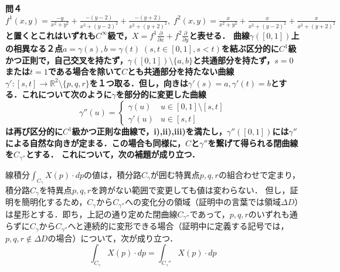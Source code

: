 \documentclass[dvipdfmx,a4paper,uplatex]{jsarticle}
\begin{document}
\bf{問４} $f^1(x,y)=\frac{-y}{x^2+y^2}+\frac{-(y-2)}{x^2+(y-2)^2}+\frac{-(y+2)}{x^2+(y+2)^2},\; f^2(x,y)=\frac{x}{x^2+y^2}+\frac{x}{x^2+(y-2)^2}+\frac{x}{x^2+(y+2)^2}$と置くとこれはいずれも$C^\infty$級で，$X=f^1\frac{\partial}{\partial x}+f^2\frac{\partial}{\partial y}$と表せる．
曲線$\gamma([0,1])$上の相異なる２点$a=\gamma(s),b=\gamma(t)\;(s,t\in[0,1],s<t)$を結ぶ区分的に$C^1$級かつ正則で，自己交叉を持たず，$\gamma([0,1])\setminus \{a,b\}$と共通部分を持たず，$s=0$または$t=1$である場合を除いて$C$とも共通部分を持たない曲線$\gamma':[s,t]\to\mathbb{R}^2\setminus\{p,q,r\}$を１つ取る．但し，向きは$\gamma'(s)=a,\gamma'(t)=b$とする．これについて次のように$\gamma$を部分的に変更した曲線
\[\gamma''(u)=\begin{cases}
    \gamma(u) & u\in [0,1]\setminus [s,t]\\
    \gamma'(u) & u\in [s,t]
\end{cases}\]
は再び区分的に$C^1$級かつ正則な曲線で，i),ii),iii)を満たし，$\gamma''([0,1])$には$\gamma''$による自然な向きが定まる．この場合も同様に，$C$と$\gamma''$を繋げて得られる閉曲線を$C_{\gamma''}$とする．
これについて，次の補題が成り立つ．
\begin{lemma*}
    線積分$\int_{C_\gamma}X(p)\cdot dp$の値は，積分路$C_\gamma$が囲む特異点$p,q,r$の組合わせで定まり，積分路$C_\gamma$を特異点$p,q,r$を跨がない範囲で変更しても値は変わらない．
    但し，証明を簡明化するため，$C_\gamma$から$C_{\gamma''}$への変化分の領域（証明中の言葉では領域$\Delta D$）は星形とする．即ち，上記の通り定めた閉曲線$C_{\gamma''}$であって，$p,q,r$のいずれも通らずに$C_\gamma$から$C_{\gamma''}$へと連続的に変形できる場合（証明中に定義する記号では，$p,q,r\notin \Delta D$の場合）について，次が成り立つ．
    \[ \int_{C_\gamma}X(p)\cdot dp = \int_{C_\gamma''}X(p)\cdot dp \]
\end{lemma*}
\end{document}

